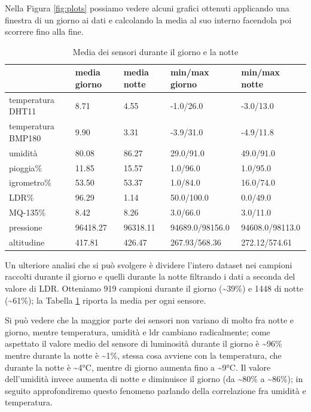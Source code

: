 \documentclass[a4paper, 12pt]{report}
\begin{document}
Nella Figura \ref{fig:plots} possiamo vedere alcuni grafici ottenuti applicando una finestra di un giorno ai dati e calcolando la media al suo interno facendola poi scorrere fino alla fine.

\begin{table}
  \centering
  \begin{tabular}{ l l l l l }
  \hline
   & media giorno & media notte & min/max giorno & min/max notte \\
  \hline
  temperatura DHT11 & 8.71 & 4.55 & -1.0/26.0 & -3.0/13.0 \\
  temperatura BMP180 & 9.90 & 3.31 & -3.9/31.0 & -4.9/11.8 \\
  umidità & 80.08 & 86.27 & 29.0/91.0 & 49.0/91.0 \\
  pioggia\% & 11.85 & 15.57 & 1.0/96.0 & 1.0/95.0 \\
  igrometro\% & 53.50 & 53.37 & 1.0/84.0 & 16.0/74.0 \\
  LDR\% & 96.29 & 1.14 & 50.0/100.0 & 0.0/49.0 \\
  MQ-135\% & 8.42 & 8.26 & 3.0/66.0 & 3.0/11.0 \\
  pressione & 96418.27 & 96318.11 & 94689.0/98156.0 & 94608.0/98113.0 \\
  altitudine & 417.81 & 426.47 & 267.93/568.36 & 272.12/574.61 \\
  \hline
  \end{tabular}
  \caption{Media dei sensori durante il giorno e la notte}
  \label{tab:daynight}
\end{table}

Un ulteriore analisi che si può svolgere è dividere l'intero dataset nei campioni raccolti durante il giorno e quelli durante la notte filtrando i dati a seconda del valore di LDR. 
Otteniamo 919 campioni durante il giorno (\textasciitilde39\%) e 1448 di notte (\textasciitilde61\%); la Tabella \ref{tab:daynight} riporta la media per ogni sensore.

Si può vedere che la maggior parte dei sensori non variano di molto fra notte e giorno, mentre temperatura, umidità e ldr cambiano radicalmente; come aspettato il valore medio 
del sensore di luminosità durante il giorno è \textasciitilde96\% mentre durante la notte è \textasciitilde1\%, stessa cosa avviene con la temperatura, che durante la notte è \textasciitilde4°C, mentre di 
giorno aumenta fino a \textasciitilde9°C. Il valore dell'umidità invece aumenta di notte e diminuisce il giorno (da \textasciitilde80\% a \textasciitilde86\%); in seguito approfondiremo questo fenomeno parlando 
della correlazione fra umidità e temperatura.
\end{document}
